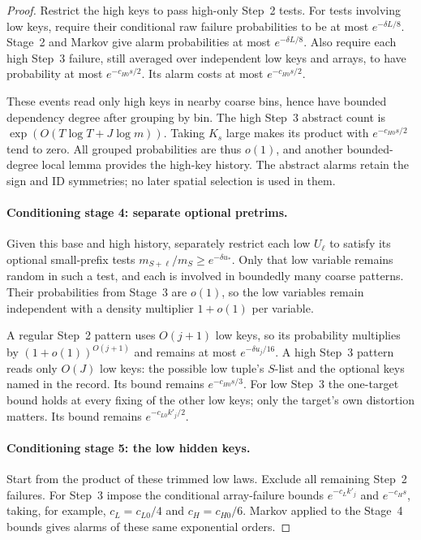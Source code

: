 \begin{proof}
Restrict the high keys to pass high-only Step~2 tests. For tests involving
low keys, require their conditional raw failure probabilities to be at
most \(e^{-\delta L/8}\). Stage~2 and Markov give alarm probabilities
at most \(e^{-\delta L/8}\). Also require each high Step~3 failure,
still averaged over independent low keys and arrays, to have probability
at most \(e^{-c_{H0}s/2}\). Its alarm costs at most
\(e^{-c_{H0}s/2}\).

These events read only high keys in nearby coarse bins, hence have
bounded dependency degree after grouping by bin. The high Step~3
abstract count is \(\exp(O(T\log T+J\log m))\). Taking \(K_s\) large
makes its product with \(e^{-c_{H0}s/2}\) tend to zero. All grouped
probabilities are thus \(o(1)\), and another bounded-degree local lemma
provides the high-key history. The abstract alarms retain the sign and
ID symmetries; no later spatial selection is used in them.

\paragraph{Conditioning stage 4: separate optional pretrims.}
Given this base and high history, separately restrict each low \(U_\ell\)
to satisfy its optional small-prefix tests
\(m_{S+\ell}/m_S\ge e^{-\delta u_*}\). Only that low variable remains
random in such a test, and each is involved in boundedly many coarse
patterns. Their probabilities from Stage~3 are \(o(1)\), so the low
variables remain independent with a density multiplier \(1+o(1)\) per
variable.

A regular Step~2 pattern uses \(O(j+1)\) low keys, so its probability
multiplies by \((1+o(1))^{O(j+1)}\) and remains at most
\(e^{-\delta u_j/16}\). A high Step~3 pattern reads only \(O(J)\)
low keys: the possible low tuple's \(S\)-list and the optional keys
named in the record. Its bound remains \(e^{-c_{H0}s/3}\). For low
Step~3 the one-target bound holds at every fixing of the other low keys;
only the target's own distortion matters. Its bound remains
\(e^{-c_{L0}k'_j/2}\).

\paragraph{Conditioning stage 5: the low hidden keys.}
Start from the product of these trimmed low laws. Exclude all remaining
Step~2 failures. For Step~3 impose the conditional array-failure bounds
\(e^{-c_Lk'_j}\) and \(e^{-c_Hs}\), taking, for example,
\(c_L=c_{L0}/4\) and \(c_H=c_{H0}/6\). Markov applied to the Stage~4
bounds gives alarms of these same exponential orders.


\end{proof}
